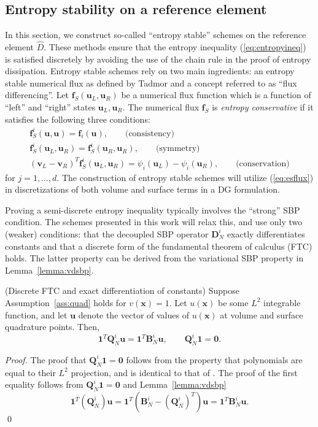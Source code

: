 \documentclass{svjour3}                     %
\renewcommand{\hat}{\widehat}
\newcommand{\LRp}[1]{\left( #1 \right)}
\begin{document}
\subsection{Entropy stability on a reference element}
\label{sec:singleelem}

In this section, we construct so-called ``entropy stable'' schemes on the reference element $\hat{D}$.  These methods ensure that the entropy inequality (\ref{eq:entropyineq}) is satisfied discretely by avoiding the use of the chain rule in the proof of entropy dissipation.  Entropy stable schemes rely on two main ingredients: an entropy stable numerical flux as defined by Tadmor \cite{tadmor1987numerical} and a concept referred to as ``flux differencing''.  Let $\bm{f}_S\LRp{\bm{u}_L,\bm{u}_R}$ be a numerical flux function which is a function of ``left'' and ``right'' states $\bm{u}_L,\bm{u}_R$.  The numerical flux $\bm{f}_S$ is \textit{entropy conservative} if it satisfies the following three conditions:  
\begin{gather}
\bm{f}^i_S(\bm{u},\bm{u}) = \bm{f}_i(\bm{u}), \qquad \text{(consistency)}\\
\bm{f}^i_S(\bm{u}_L,\bm{u}_R) = \bm{f}^i_S(\bm{u}_R,\bm{u}_R), \qquad \text{(symmetry)}\nonumber\\
\LRp{\bm{v}_L-\bm{v}_R}^T\bm{f}^i_S(\bm{u}_L,\bm{u}_R) = \psi_i(\bm{u}_L) - \psi_i(\bm{u}_R), \qquad \text{(conservation)}\nonumber
\label{eq:esflux}
\end{gather}
for $j = 1,\ldots, d$.  The construction of entropy stable schemes will utilize (\ref{eq:esflux}) in discretizations of both volume and surface terms in a DG formulation.  

Proving a semi-discrete entropy inequality typically involves the ``strong'' SBP condition.  The schemes presented in this work will relax this, and use only two (weaker) conditions: that the decoupled SBP operator $\bm{D}^i_N$ exactly differentiates constants and that a discrete form of the fundamental theorem of calculus (FTC) holds.  The latter property can be derived from the variational SBP property in Lemma~\ref{lemma:vdsbp}.

\begin{lemma}{(Discrete FTC and exact differentiation of constants)}
\label{lemma:sbpcor}
Suppose Assumption~\ref{ass:quad} holds for $v(\bm{x}) = 1$.  
Let $u(\bm{x})$ be some $L^2$ integrable function, and let $\bm{u}$ denote the vector of values of $u(\bm{x})$ at volume and surface quadrature points. Then, 
\[
\bm{1}^T\bm{Q}^i_N\bm{u} = \bm{1}^T\bm{B}^i_N\bm{u}, \qquad \bm{Q}^i_N\bm{1} = \bm{0}.
\]
\end{lemma}
\begin{proof}
The proof that $\bm{Q}^i_N \bm{1} = \bm{0}$ follows from the property that polynomials are equal to their $L^2$ projection, and is identical to that of \cite{chan2017discretely,chan2018discretely}.     The proof of the first equality follows from $\bm{Q}^i_N \bm{1} = \bm{0}$ and Lemma~\ref{lemma:vdsbp} 
\[
\bm{1}^T\LRp{\bm{Q}^i_N}\bm{u} = \bm{1}^T\LRp{\bm{B}^i_N - \LRp{\bm{Q}^i_N}^T}\bm{u} = \bm{1}^T{\bm{B}^i_N}\bm{u}.
\]
\qed\end{proof}
\end{document}
